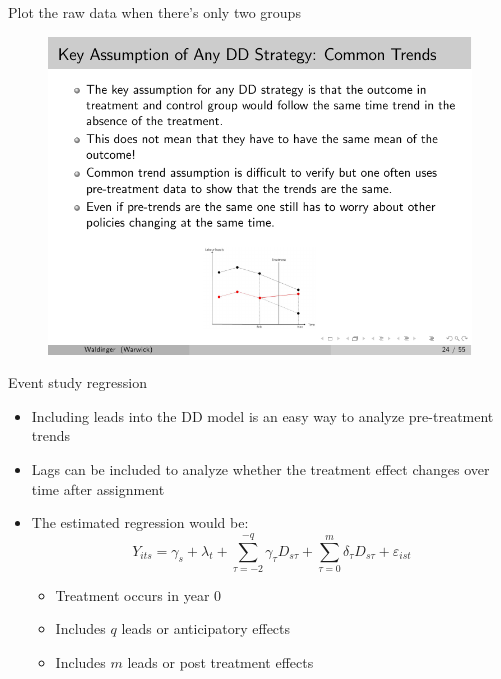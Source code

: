 \documentclass{beamer}
\begin{document}
\begin{frame}{Plot the raw data when there's only two groups}

	\begin{figure}
	\includegraphics[scale=2.5]{./lecture_includes/waldinger_dd_6.pdf}
	\end{figure}

\end{frame}



\begin{frame}{Event study regression}
	
	\begin{itemize}
	\item Including leads into the DD model is an easy way to analyze pre-treatment trends
	\item Lags can be included to analyze whether the treatment effect changes over time after assignment
	\item The estimated regression would be:$$Y_{its} = \gamma_s + \lambda_t + \sum_{\tau=-2}^{-q}\gamma_{\tau}D_{s\tau} + \sum_{\tau=0}^m\delta_{\tau}D_{s\tau}+\varepsilon_{ist}$$
		\begin{itemize}
		\item Treatment occurs in year 0
		\item Includes $q$ leads or anticipatory effects
		\item Includes $m$ leads or post treatment effects
		\end{itemize}
	\end{itemize}
\end{frame}
\end{document}
